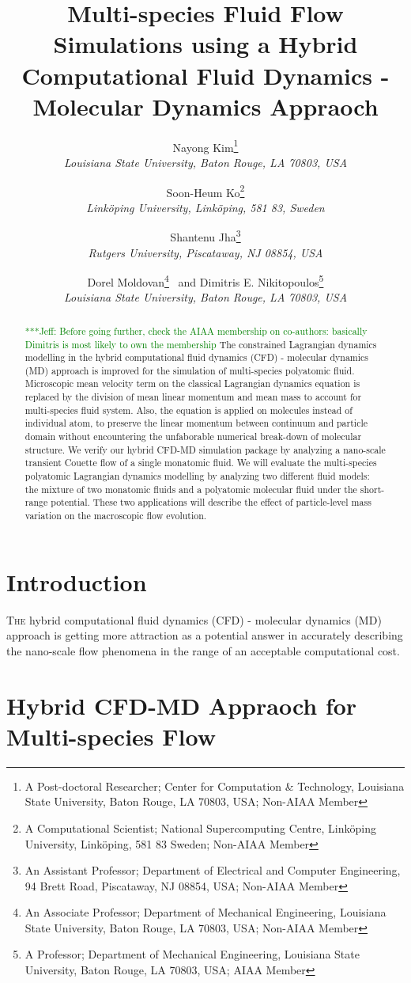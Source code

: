 \documentclass[]{aiaa-tc}%
\title{Multi-species Fluid Flow Simulations using a Hybrid Computational Fluid Dynamics - Molecular Dynamics Appraoch 
 \skonote{Or "Polyatomic Lagrangian Dynamics Modelling for a Hybrid Computational Fluid Dynamics - Molecular Dynamics Appraoch"} }
\author{
  Nayong Kim\thanks{A Post-doctoral Researcher; Center for Computation \& Technology,
  Louisiana State University, Baton Rouge, LA 70803, USA; Non-AIAA Member}\\
  {\normalsize\itshape
   Louisiana State University, Baton Rouge, LA 70803, USA}\\
  \and
  Soon-Heum Ko\thanks{A Computational Scientist; National Supercomputing Centre,
  Link\"{o}ping University, Link\"{o}ping, 581 83 Sweden; Non-AIAA Member}\\
  {\normalsize\itshape
   Link\"{o}ping University, Link\"{o}ping, 581 83, Sweden}\\
  \and
  Shantenu Jha\thanks{An Assistant Professor; Department of Electrical and Computer Engineering,
  94 Brett Road, Piscataway, NJ 08854, USA; Non-AIAA Member}\\
  {\normalsize\itshape
   Rutgers University, Piscataway, NJ 08854, USA}\\
  \and
  Dorel Moldovan\thanks{An Associate Professor; Department of Mechanical Engineering,
  Louisiana State University, Baton Rouge, LA 70803, USA; Non-AIAA Member}
    \ and
  Dimitris E. Nikitopoulos\thanks{A Professor; Department of Mechanical Engineering,
  Louisiana State University, Baton Rouge, LA 70803, USA; AIAA Member}\\
  {\normalsize\itshape
   Louisiana State University, Baton Rouge, LA 70803, USA}\\
 }
\newcommand{\skonote}[1]{ {\textcolor{green} { ***Jeff: #1 }}}
\begin{document}
\maketitle


\begin{abstract}
\skonote{Before going further, check the AIAA membership on co-authors: basically Dimitris is most likely to own the membership}
The constrained Lagrangian dynamics modelling in the hybrid computational fluid dynamics (CFD) - molecular dynamics (MD) approach is improved for the simulation of multi-species polyatomic fluid.
Microscopic mean velocity term on the classical Lagrangian dynamics equation is replaced by the division of mean linear momentum and mean mass to account for multi-species fluid system.
Also, the equation is applied on molecules instead of individual atom, to preserve the linear momentum between continuum and particle domain without encountering the unfaborable numerical break-down of molecular structure.
We verify our hybrid CFD-MD simulation package by analyzing a nano-scale transient Couette flow of a single monatomic fluid.
We will evaluate the multi-species polyatomic Lagrangian dynamics modelling by analyzing two different fluid models: the mixture of two monatomic fluids and a polyatomic molecular fluid under the short-range potential.
These two applications will describe the effect of particle-level mass variation on the macroscopic flow evolution.
\end{abstract}




\section{Introduction}
\label{sec:intro}

\lettrine[nindent=0pt]{T}{he} hybrid computational fluid dynamics (CFD) - molecular dynamics (MD) approach is getting more attraction as a potential answer in accurately describing the nano-scale flow phenomena in the range of an acceptable computational cost.



\section{Hybrid CFD-MD Appraoch for Multi-species Flow}
\label{sec:hybrid}
\end{document}
